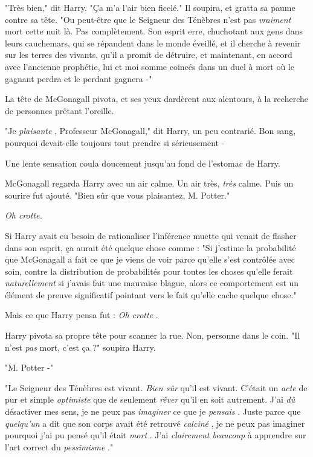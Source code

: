 "Très bien," dit Harry. "Ça m'a l'air bien ficelé." Il soupira, et gratta sa paume contre sa tête. "Ou peut-être que le Seigneur des Ténèbres n'est pas \emph{vraiment}  mort cette nuit là. Pas complètement. Son esprit erre, chuchotant aux gens dans leurs cauchemars, qui se répandent dans le monde éveillé, et il cherche à revenir sur les terres des vivants, qu'il a promit de détruire, et maintenant, en accord avec l'ancienne prophétie, lui et moi somme coincés dans un duel à mort où le gagnant perdra et le perdant gagnera -"

La tête de McGonagall pivota, et ses yeux dardèrent aux alentours, à la recherche de personnes prêtant l'oreille.

"Je \emph{plaisante} , Professeur McGonagall," dit Harry, un peu contrarié. Bon sang, pourquoi devait-elle toujours tout prendre si sérieusement -

Une lente sensation coula doucement jusqu'au fond de l'estomac de Harry.

McGonagall regarda Harry avec un air calme. Un air très, \emph{très}  calme. Puis un sourire fut ajouté. "Bien sûr que vous plaisantez, M. Potter."

\emph{Oh crotte.} 

Si Harry avait eu besoin de rationaliser l'inférence muette qui venait de flasher dans son esprit, ça aurait été quelque chose comme : "Si j'estime la probabilité que McGonagall a fait ce que je viens de voir parce qu'elle s'est contrôlée avec soin, contre la distribution de probabilités pour toutes les choses qu'elle ferait \emph{naturellement}  si j'avais fait une mauvaise blague, alors ce comportement est un élément de preuve significatif pointant vers le fait qu'elle cache quelque chose."

Mais ce que Harry pensa fut : \emph{Oh crotte} .

Harry pivota sa propre tête pour scanner la rue. Non, personne dans le coin. "Il n'est \emph{pas}  mort, c'est ça ?" soupira Harry.

"M. Potter -"

"Le Seigneur des Ténèbres est vivant. \emph{Bien sûr}  qu'il est vivant. C'était un \emph{acte}  de pur et simple \emph{optimiste}  que de seulement \emph{rêver}  qu'il en soit autrement. J'ai \emph{dû}  désactiver mes sens, je ne peux pas \emph{imaginer}  ce que je \emph{pensais} . Juste parce que \emph{quelqu'un}  a dit que son corps avait été retrouvé \emph{calciné} , je ne peux pas imaginer pourquoi j'ai pu pensé qu'il était \emph{mort} . J'ai \emph{clairement beaucoup}  à apprendre sur l'art correct du \emph{pessimisme} ."

